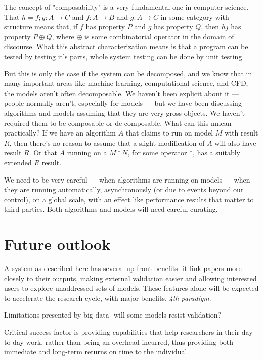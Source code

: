 \documentclass[conference]{IEEEtran}
\begin{document}

The concept of "composability" is a very fundamental one in computer science. 
That $h = f;g : A \rightarrow C$ and $f : A \rightarrow B$ and $g : A \rightarrow C$ 
in some category with structure means that, if $f$ has property $P$ and $g$ has
property $Q$, then $hj$ has property $P \oplus Q$, where $\oplus$ is some 
combinatorial operator in the domain of discourse. What this abstract 
characterization means is that a program can be tested by testing it's parts,
whole system testing can be done by unit testing. 

But this is only the case if the system can be decomposed, and we know that in
many important areas like machine learning, computational science, and CFD,
the models aren't often decomposable.  We haven't been explicit about it ---
people normally aren't, especially for models ---  but we have been discussing
algorithms and models assuming that they are very gross objects. We haven't
required them to be composable or de-composable. What can this mnean
practically? If we have an algorithm $A$ that claims to  run on model $M$ with
result $R$, then there's no reason to assume that a slight modification of $A$
will also have result $R$. Or that $A$ running on a $M * N$, for some operator
$*$, has a suitably extended $R$ result.

We need to be very careful --- when algorithms are running on models --- when
they are running automatically, asynchronously (or due to events beyond our
control), on a global scale, with an effect like performance results that
matter to third-parties. Both algorithms and  models will need careful
curating.





\section{Future outlook}

A system as described here has several up front benefits- it link papers 
more closely to their outputs, making external validation easier and 
allowing interested users to explore unaddressed sets of models. These 
features alone will be expected to accelerate the research cycle, with
major benefits. \emph{4th paradigm}.

Limitations presented by big data- will some models resist validation?

Critical success factor is providing capabilities that help researchers 
in their day-to-day work, rather than being an overhead incurred, thus 
providing both immediate and long-term returns on time to the individual.





\end{document}
